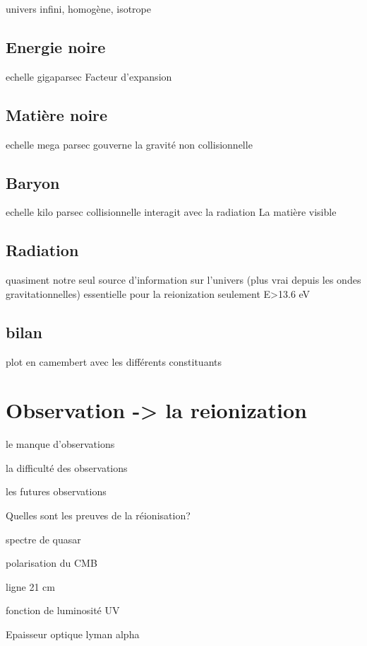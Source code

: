 univers infini, homogène, isotrope

\subsection{Energie noire}

echelle gigaparsec
Facteur d'expansion

\subsection{Matière noire}

echelle mega parsec
gouverne la gravité
non collisionnelle

\subsection{Baryon}

echelle kilo parsec
collisionnelle
interagit avec la radiation
La matière visible

\subsection{Radiation}

quasiment notre seul source d'information sur l'univers (plus vrai depuis les ondes gravitationnelles)
essentielle pour la reionization
seulement E>13.6 eV

\subsection{bilan}

plot en camembert avec les différents constituants

\section{Observation -> la reionization}

le manque d'observations

la difficulté des observations

les futures observations

Quelles sont les preuves de la réionisation?

spectre de quasar

polarisation du CMB

ligne 21 cm

fonction de luminosité UV

Epaisseur optique lyman alpha

